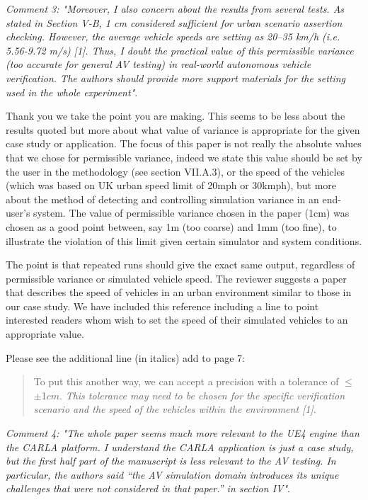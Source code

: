 \documentclass[11pt, a4paper]{letter} %
\begin{document}
\begin{letter}
\bigskip

\textit{Comment 3: "Moreover, I also concern about the results from several tests. As stated in Section V-B, 1 cm considered sufficient for urban scenario assertion checking. However, the average vehicle speeds are setting as 20–35 km/h (i.e. 5.56-9.72 m/s) [1]. Thus, I doubt the practical value of this permissible variance (too accurate for general AV testing) in real-world autonomous vehicle verification. The authors should provide more support materials for the setting used in the whole experiment"}.

Thank you we take the point you are making. This seems to be less about the results quoted but more about what value of variance is appropriate for the given case study or application. The focus of this paper is not really the absolute values that we chose for permissible variance, indeed we state this value should be set by the user in the methodology (see section VII.A.3), or the speed of the vehicles (which was based on UK urban speed limit of 20mph or 30kmph), but more about the method of detecting and controlling simulation variance in an end-user's system. The value of permissible variance chosen in the paper (1cm) was chosen as a good point between, say 1m (too coarse) and 1mm (too fine), to illustrate the violation of this limit given certain simulator and system conditions.

The point is that repeated runs should give the exact same output, regardless of permissible variance or simulated vehicle speed. The reviewer suggests a paper that describes the speed of vehicles in an urban environment similar to those in our case study. We have included this reference including a line to point interested readers whom wish to set the speed of their simulated vehicles to an appropriate value.

Please see the additional line (in italics) add to page 7: 
\begin{quote}
To put this another way, we can accept a precision with a tolerance of $\leq$$\pm$1$cm$. \textit{This tolerance may need to be chosen for the specific verification scenario and the speed of the vehicles within the environment [1]}.
\end{quote}


\bigskip


\textit{Comment 4: "The whole paper seems much more relevant to the UE4 engine than the CARLA platform. I understand the CARLA application is just a case study, but the first half part of the manuscript is less relevant to the AV testing. In particular, the authors said “the AV simulation domain introduces its unique challenges that were not considered in that paper.” in section IV"}.


\end{letter}
\end{document}
